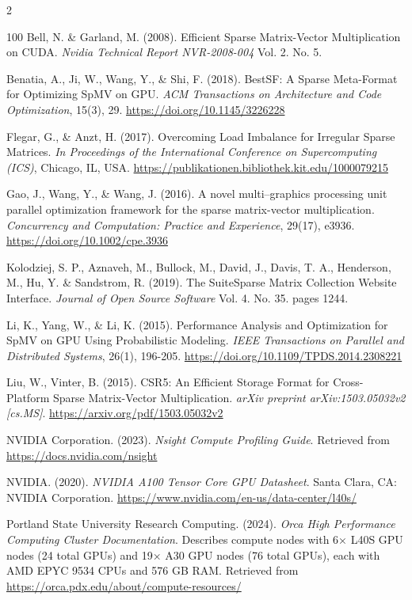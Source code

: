 \documentclass{article}
\begin{document}
\begin{multicols}{2}
\begin{thebibliography}{100}
Bell, N. \& Garland, M. (2008). Efficient Sparse Matrix-Vector Multiplication on CUDA.
\emph{Nvidia Technical Report NVR-2008-004} Vol. 2. No. 5.

 Benatia, A., Ji, W., Wang, Y., \& Shi, F. (2018). BestSF: A Sparse Meta-Format for Optimizing SpMV on GPU. \emph{ACM Transactions on Architecture and Code Optimization}, 15(3), 29. \url{https://doi.org/10.1145/3226228}

Flegar, G., \& Anzt, H. (2017). Overcoming Load Imbalance for Irregular Sparse Matrices. 
\emph{In Proceedings of the International Conference on Supercomputing (ICS)}, Chicago, IL, USA.
\url{https://publikationen.bibliothek.kit.edu/1000079215}

Gao, J., Wang, Y., \& Wang, J. (2016). A novel multi–graphics processing unit parallel optimization framework for the sparse matrix-vector multiplication.
\emph{Concurrency and Computation: Practice and Experience}, 29(17), e3936.
\url{https://doi.org/10.1002/cpe.3936}

Kolodziej, S. P., Aznaveh, M., Bullock, M., David, J., Davis, T. A., Henderson, M., Hu, Y. \& Sandstrom, R. (2019). The {SuiteSparse} Matrix Collection Website Interface. \emph{Journal of Open Source Software} Vol. 4. No. 35. pages 1244.

Li, K., Yang, W., \& Li, K. (2015). Performance Analysis and Optimization for SpMV on GPU Using Probabilistic Modeling. 
\emph{IEEE Transactions on Parallel and Distributed Systems}, 26(1), 196-205.
\url{https://doi.org/10.1109/TPDS.2014.2308221}


Liu, W., Vinter, B. (2015). CSR5: An Efficient Storage Format for Cross-Platform Sparse Matrix-Vector Multiplication.
\emph{arXiv preprint arXiv:1503.05032v2 [cs.MS]}.
\url{https://arxiv.org/pdf/1503.05032v2}

NVIDIA Corporation. (2023). \emph{Nsight Compute Profiling Guide}.
Retrieved from \url{https://docs.nvidia.com/nsight}


NVIDIA. (2020). \emph{NVIDIA A100 Tensor Core GPU Datasheet}. 
Santa Clara, CA: NVIDIA Corporation. 
\url{https://www.nvidia.com/en-us/data-center/l40s/}


Portland State University Research Computing. (2024). \emph{Orca High Performance Computing Cluster Documentation}. 
Describes compute nodes with 6× L40S GPU nodes (24 total GPUs) and 19× A30 GPU nodes (76 total GPUs), 
each with AMD EPYC 9534 CPUs and 576 GB RAM. Retrieved from \url{https://orca.pdx.edu/about/compute-resources/}


\end{thebibliography}
\end{multicols}
\end{document}
